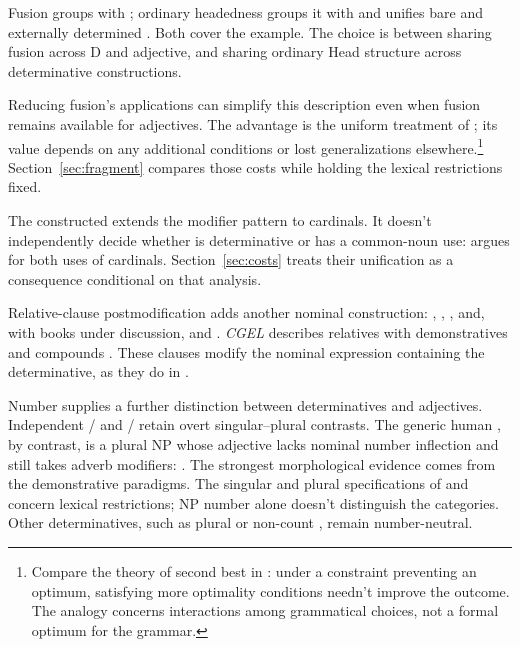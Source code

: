 \documentclass[12pt]{article}
\begin{document}
Fusion groups  with ; ordinary headedness groups it with  and unifies bare and externally determined . Both cover the example. The choice is between sharing fusion across D and adjective, and sharing ordinary Head structure across determinative constructions.

Reducing fusion's applications can simplify this description even when fusion remains available for adjectives. The advantage is the uniform treatment of ; its value depends on any additional conditions or lost generalizations elsewhere.\footnote{Compare the theory of second best in \textcite[11--12]{lipseylancaster1956secondbest}: under a constraint preventing an optimum, satisfying more optimality conditions needn't improve the outcome. The analogy concerns interactions among grammatical choices, not a formal optimum for the grammar.} Section~\ref{sec:fragment} compares those costs while holding the lexical restrictions fixed.

The constructed  extends the modifier pattern to cardinals. It doesn't independently decide whether  is determinative or has a common-noun use: \textcite{reynolds2026numerals} argues for both uses of cardinals. Section~\ref{sec:costs} treats their unification as a consequence conditional on that analysis.

Relative-clause postmodification adds another nominal construction: , , , and, with books under discussion,  and . \textit{CGEL} describes relatives with demonstratives and compounds \citep[414, 422--423]{huddleston2002}. These clauses modify the nominal expression containing the determinative, as they do in .

Number supplies a further distinction between determinatives and adjectives. Independent /\allowbreak{} and /\allowbreak{} retain overt singular--plural contrasts. The generic human , by contrast, is a plural NP whose adjective lacks nominal number inflection and still takes adverb modifiers:  \citep[418]{huddleston2002}. The strongest morphological evidence comes from the demonstrative paradigms. The singular and plural specifications of  and  concern lexical restrictions; NP number alone doesn't distinguish the categories. Other determinatives, such as plural or non-count , remain number-neutral.
\end{document}

